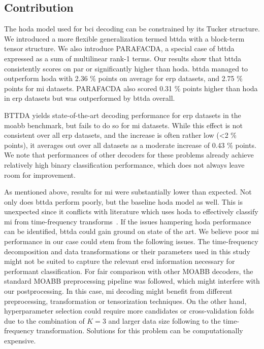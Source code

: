 \documentclass[twocolumn]{article}
\begin{document}
\subsection{Contribution}

The \ac{hoda} model used for \ac{bci} decoding can be constrained by its
Tucker structure.
We introduced a more flexible generalization termed \ac{bttda} with a
block-term tensor structure.
We also introduce \ac{PARAFACDA}, a special case of \ac{bttda} expressed as a
sum of multilinear rank-1 terms.
Our results show that \ac{bttda} consistently scores on par or significantly higher than
\ac{hoda}.
\Ac{bttda} managed to outperform \ac{hoda} with 2.36 \% points on average for
\ac{erp} datasets, and 2.75 \% points for \ac{mi} datasets.
PARAFACDA also scored 0.31 \% points higher than  \ac{hoda} in \ac{erp} datasets
but was outperformed by \ac{bttda} overall.

BTTDA yields state-of-the-art decoding performance for \ac{erp}
datasets in the \ac{moabb} benchmark, but fails to do so for \ac{mi} datasets.
While this effect is not consistent over all \ac{erp} datasets, and the
increase is often rather low (<2 \% points), it averages out over all datasets
as a moderate increase of 0.43 \% points.
We note that performances of other decoders for these problems already achieve
relatively high binary classification performance, which does not always leave
room for improvement.

As mentioned above, results for \ac{mi} were substantially lower than expected.
Not only does \ac{bttda} perform poorly, but the baseline \ac{hoda} model as well.
This is unexpected since it conflicts with literature which uses \ac{hoda} to
effectively classify \ac{mi} from time-frequency transforms~\cite{Phan2010,Lotte2018,Liu2015,Cai2021}.
If the issues hampering \ac{hoda} performance can be identified, \ac{bttda}
could gain ground on state of the art.
We believe poor \ac{mi} performance in our case could stem from the following issues.
The time-frequency decomposition and data transformations or their parameters
used in this study might not be suited to capture the relevant \ac{ersd}
information necessary for performant classification.
For fair comparison with other MOABB decoders, the standard MOABB preprocessing
pipeline was followed, which might interfere with our postprocessing.
In this case, \ac{mi} decoding might benefit from different preprocessing,
transformation or	tensorization techniques.
On the other hand, hyperparameter selection could require more candidates or
cross-validation folds due to the combination of $K=3$ and larger data size following to the
time-frequency transformation.
Solutions for this problem can be computationally expensive.
\end{document}
